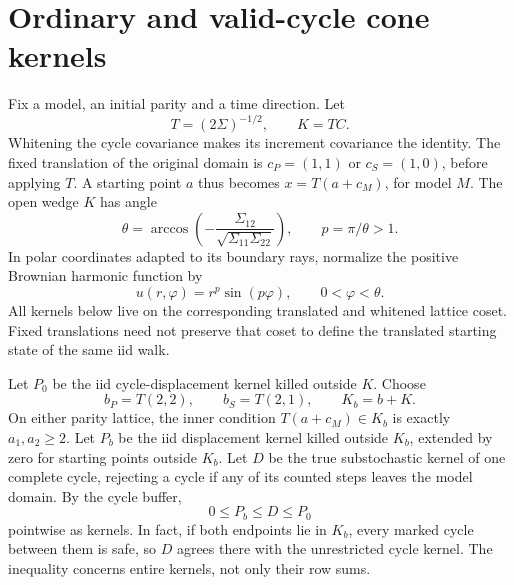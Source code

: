\documentclass[11pt,letterpaper]{article}
\numberwithin{equation}{section}
\theoremstyle{remark}\newtheorem{remark}[theorem]{Remark}
\begin{document}
\section{Ordinary and valid-cycle cone kernels}\label{cps:amp:sec:kernels}
Fix a model, an initial parity and a time direction. Let
\begin{equation}\label{cps:amp:eq:whitening}
 T=(2\Sigma)^{-1/2},\qquad K=TC.
\end{equation}
Whitening the cycle covariance makes its increment covariance the identity. The fixed translation of the original domain is $c_P=(1,1)$ or $c_S=(1,0)$, before applying $T$. A starting point $a$ thus becomes $x=T(a+c_M)$, for model $M$. The open wedge $K$ has angle
\begin{equation}
 \theta=\arccos\!\left(-\frac{\Sigma_{12}}{\sqrt{\Sigma_{11}\Sigma_{22}}}\right),
 \qquad p=\pi/\theta>1.
\end{equation}
In polar coordinates adapted to its boundary rays, normalize the positive Brownian harmonic function by
\begin{equation}\label{cps:amp:eq:u}
 u(r,\varphi)=r^p\sin(p\varphi),\qquad0<\varphi<\theta.
\end{equation}
All kernels below live on the corresponding translated and whitened lattice coset. Fixed translations need not preserve that coset to define the translated starting state of the same iid walk.

Let $P_0$ be the iid cycle-displacement kernel killed outside $K$. Choose
\begin{equation}
 b_P=T(2,2),\qquad b_S=T(2,1),\qquad K_b=b+K.
\end{equation}
On either parity lattice, the inner condition $T(a+c_M)\in K_b$ is exactly $a_1,a_2\ge2$. Let $P_b$ be the iid displacement kernel killed outside $K_b$, extended by zero for starting points outside $K_b$. Let $D$ be the true substochastic kernel of one complete cycle, rejecting a cycle if any of its counted steps leaves the model domain. By the cycle buffer,
\begin{equation}\label{cps:amp:eq:kernelorder}
 0\le P_b\le D\le P_0
\end{equation}
pointwise as kernels. In fact, if both endpoints lie in $K_b$, every marked cycle between them is safe, so $D$ agrees there with the unrestricted cycle kernel. The inequality concerns entire kernels, not only their row sums.
\end{document}
